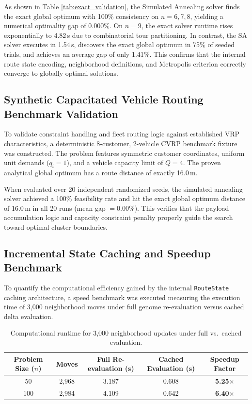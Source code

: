 As shown in Table \ref{tab:exact_validation}, the Simulated Annealing solver finds the exact global optimum with 100\% consistency on $n=6, 7, 8$, yielding a numerical optimality gap of $0.000\%$. On $n=9$, the exact solver runtime rises exponentially to 4.82\,s due to combinatorial tour partitioning. In contrast, the SA solver executes in 1.54\,s, discovers the exact global optimum in 75\% of seeded trials, and achieves an average gap of only 1.41\%. This confirms that the internal route state encoding, neighborhood definitions, and Metropolis criterion correctly converge to globally optimal solutions.

\subsection{Synthetic Capacitated Vehicle Routing Benchmark Validation}
To validate constraint handling and fleet routing logic against established VRP characteristics, a deterministic 8-customer, 2-vehicle \ac{CVRP} benchmark fixture was constructed. The problem features symmetric customer coordinates, uniform unit demands ($q_i = 1$), and a vehicle capacity limit of $Q = 4$. The proven analytical global optimum has a route distance of exactly 16.0\,m.

When evaluated over 20 independent randomized seeds, the simulated annealing solver achieved a 100\% feasibility rate and hit the exact global optimum distance of 16.0\,m in all 20 runs (mean gap $= 0.00\%$). This verifies that the payload accumulation logic and capacity constraint penalty properly guide the search toward optimal cluster boundaries.

\subsection{Incremental State Caching and Speedup Benchmark}
To quantify the computational efficiency gained by the internal \texttt{RouteState} caching architecture, a speed benchmark was executed measuring the execution time of 3,000 neighborhood moves under full genome re-evaluation versus cached delta evaluation.

\begin{table}[htbp]
\centering
\caption{Computational runtime for 3,000 neighborhood updates under full vs.\ cached evaluation.}
\label{tab:speed_benchmark}
\begin{tabular}{ccccc}
\toprule
Problem Size ($n$) & Moves & Full Re-evaluation (s) & Cached Evaluation (s) & Speedup Factor \\
\midrule
50 & 2,968 & 3.187 & 0.608 & \textbf{5.25$\times$} \\
100 & 2,984 & 4.109 & 0.642 & \textbf{6.40$\times$} \\
\bottomrule
\end{tabular}
\end{table}

